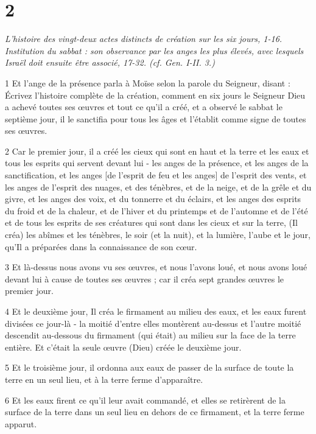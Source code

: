 \chapter{2}

\par \textit{L'histoire des vingt-deux actes distincts de création sur les six jours, 1-16. Institution du sabbat : son observance par les anges les plus élevés, avec lesquels Israël doit ensuite être associé, 17-32. (cf. Gen. I-II. 3.)}

\par 1 Et l'ange de la présence parla à Moïse selon la parole du Seigneur, disant : Écrivez l'histoire complète de la création, comment en six jours le Seigneur Dieu a achevé toutes ses œuvres et tout ce qu'il a créé, et a observé le sabbat le septième jour, il le sanctifia pour tous les âges et l'établit comme signe de toutes ses œuvres.
\par 2 Car le premier jour, il a créé les cieux qui sont en haut et la terre et les eaux et tous les esprits qui servent devant lui - les anges de la présence, et les anges de la sanctification, et les anges [de l'esprit de feu et les anges] de l'esprit des vents, et les anges de l'esprit des nuages, et des ténèbres, et de la neige, et de la grêle et du givre, et les anges des voix, et du tonnerre et du éclairs, et les anges des esprits du froid et de la chaleur, et de l'hiver et du printemps et de l'automne et de l'été et de tous les esprits de ses créatures qui sont dans les cieux et sur la terre, (Il créa) les abîmes et les ténèbres, le soir (et la nuit), et la lumière, l'aube et le jour, qu'Il a préparées dans la connaissance de son cœur.
\par 3 Et là-dessus nous avons vu ses œuvres, et nous l'avons loué, et nous avons loué devant lui à cause de toutes ses œuvres ; car il créa sept grandes œuvres le premier jour.
\par 4 Et le deuxième jour, Il créa le firmament au milieu des eaux, et les eaux furent divisées ce jour-là - la moitié d'entre elles montèrent au-dessus et l'autre moitié descendit au-dessous du firmament (qui était) au milieu sur la face de la terre entière. Et c'était la seule œuvre (Dieu) créée le deuxième jour.
\par 5 Et le troisième jour, il ordonna aux eaux de passer de la surface de toute la terre en un seul lieu, et à la terre ferme d'apparaître.
\par 6 Et les eaux firent ce qu'il leur avait commandé, et elles se retirèrent de la surface de la terre dans un seul lieu en dehors de ce firmament, et la terre ferme apparut.
